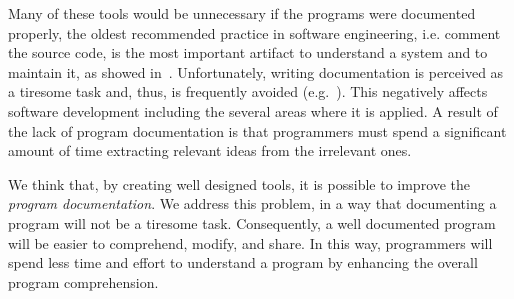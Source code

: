 Many of these tools would be unnecessary if the programs were documented properly, the oldest recommended practice in software engineering, i.e. comment the source code, is the most important artifact to understand a system and to maintain it, as showed in~\cite{de2005study}. Unfortunately, writing documentation is perceived as a tiresome task and, thus, is frequently avoided (e.g.~\cite{sousa1998survey}). This negatively affects software development including the several areas where it is applied. A result of the lack of program documentation is that programmers must spend a significant amount of time extracting relevant ideas from the irrelevant ones.

We think that, by creating well designed tools, it is possible to improve the \textit{program documentation}. We address this problem, in a way that documenting a program will not be a tiresome task. Consequently, a well documented program will be easier to comprehend, modify, and share. In this way, programmers will spend less time and effort to understand a program by enhancing the overall program comprehension.
